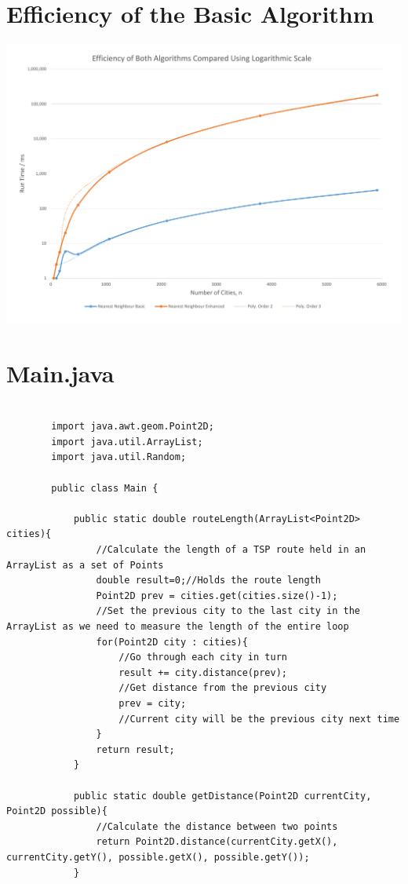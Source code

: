 \documentclass[conference,backref=page]{acmsiggraph}
\begin{document}
\begin{appendices}
	\section{Efficiency of the Basic Algorithm}
		\label{efficiencycomparedgraph}
		\includegraphics[width=\textwidth]{images/efficiency_compared.pdf}
	
	\clearpage
	\onecolumn
	\section{Main.java}
	\label{maincode}
	\begin{lstlisting}
	
		import java.awt.geom.Point2D;
		import java.util.ArrayList;
		import java.util.Random;
		
		public class Main {
		
			public static double routeLength(ArrayList<Point2D> cities){
				//Calculate the length of a TSP route held in an ArrayList as a set of Points
				double result=0;//Holds the route length
				Point2D prev = cities.get(cities.size()-1);
				//Set the previous city to the last city in the ArrayList as we need to measure the length of the entire loop
				for(Point2D city : cities){
					//Go through each city in turn
					result += city.distance(prev);
					//Get distance from the previous city
					prev = city;
					//Current city will be the previous city next time
				}
				return result;
			}
			
			public static double getDistance(Point2D currentCity, Point2D possible){
				//Calculate the distance between two points
				return Point2D.distance(currentCity.getX(), currentCity.getY(), possible.getX(), possible.getY());
			}
			

\end{lstlisting}
\end{appendices}
\end{document}

